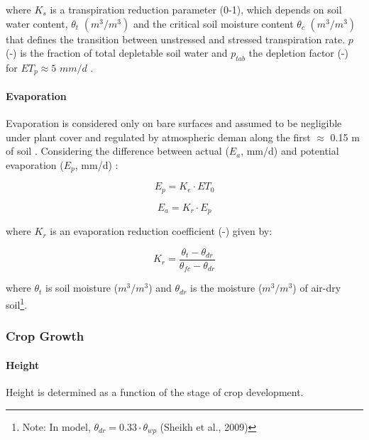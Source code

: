 \documentclass[]{article}
\let\oldparagraph\paragraph
\renewcommand{\paragraph}[1]{\oldparagraph{#1}\mbox{}}
\let\rmarkdownfootnote\footnote%
\def\footnote{\protect\rmarkdownfootnote}
\begin{document}
where \(K_s\) is a transpiration reduction parameter (0-1), which
depends on soil water content, \(\theta_t\) \((m^3/m^3)\) and the
critical soil moisture content \(\theta_c\) \((m^3/m^3)\) that defines
the transition between unstressed and stressed transpiration rate. \(p\)
(-) is the fraction of total depletable soil water and \(p_{tab}\) the
depletion factor (-) for \(ET_p \approx 5\) \(mm/d\) \citep[Table no.
22]{Allen1998}.

\paragraph{Evaporation}\label{evaporation}

Evaporation is considered only on bare surfaces and assumed to be
negligible under plant cover and regulated by atmospheric deman along
the first \(\approx\) 0.15 m of soil \citep{Sheikh2009}. Considering the
difference between actual (\(E_a\), mm/d) and potential evaporation
(\(E_p\), mm/d) \citep{Allen1998}:

\begin{equation}
E_p=K_e \cdot ET_0
\label{eq:Ep}  
\end{equation}

\begin{equation}
E_a=K_r \cdot E_p
\label{eq:Ea}  
\end{equation}

where \(K_r\) is an evaporation reduction coefficient (-) given by:

\begin{equation}
K_r = \frac{ \theta_t - \theta_{dr} }{ \theta_{fc} - \theta_{dr} }
\label{eq:Kr}  
\end{equation}

where \(\theta_t\) is soil moisture (\(m^3/m^3\)) and \(\theta_{dr}\) is
the moisture (\(m^3/m^3\)) of air-dry
soil\footnote{Note: In model, $\theta_{dr} = 0.33 \cdot \theta_{wp}$ (Sheikh et al., 2009)}.

\subsubsection{Crop Growth}\label{crop-growth}

\paragraph{Height}\label{height}

Height is determined as a function of the stage of crop development.
\end{document}
